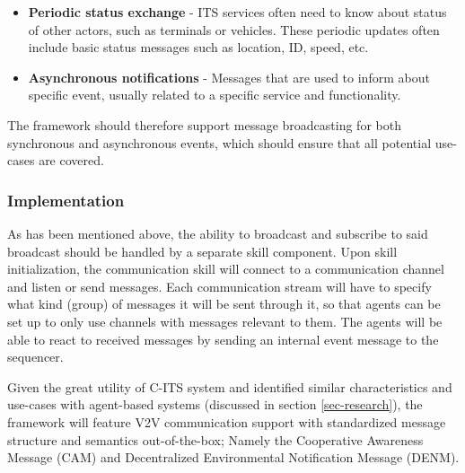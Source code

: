 \documentclass[main.tex]{subfiles}
\begin{document}
\begin{itemize}
    \item \textbf{Periodic status exchange} - ITS services often need to know about 
    status of other actors, such as terminals or vehicles. These periodic updates 
    often include basic status messages such as location, ID, speed, etc.
    \item \textbf{Asynchronous notifications} - Messages that are used to inform 
    about specific event, usually related to a specific service and functionality.
\end{itemize}



The framework should therefore support message broadcasting for both synchronous and 
asynchronous events, which should ensure that all potential use-cases are covered. 

\subsubsection{Implementation}

As has been mentioned above, the ability to broadcast and subscribe to said broadcast should be
handled by a separate skill component. Upon skill initialization, the communication skill will
connect to a communication channel and listen or send messages. Each communication stream will have 
to specify what kind (group) of messages it will be sent through it, so that agents can be set up to 
only use channels with messages relevant to them. The agents will be able to react to received
messages by sending an internal event message to the sequencer. 

Given the great utility of C-ITS system and identified similar characteristics and use-cases 
with agent-based systems (discussed in section \ref{sec-research}), the framework will feature 
V2V communication support with standardized message structure and semantics out-of-the-box; 
Namely the Cooperative Awareness Message (CAM) and Decentralized Environmental Notification Message (DENM).
\end{document}
